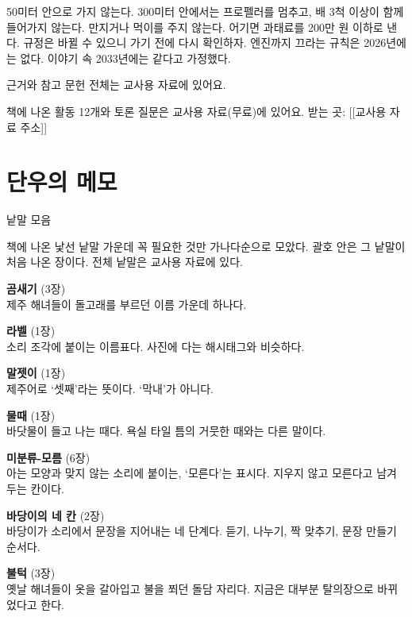 \documentclass[
  korean,
  letterpaper,
  twoside,
  open=any,
  fontsize=12.5pt,
  headings=small]{scrbook}
\newcommand{\backmatterstyle}{\setlength{\parindent}{0pt}\setlength{\parskip}{0.45em plus 0.1em}\backmattersize}
\newcommand{\backmattersize}{\fontsize{10.5pt}{16.5pt}\selectfont}
\begin{document}

50미터 안으로 가지 않는다.
300미터 안에서는 프로펠러를
멈추고, 배 3척 이상이 함께
들어가지 않는다. 만지거나
먹이를 주지 않는다. 어기면
과태료를 200만 원 이하로 낸다.
규정은 바뀔 수 있으니 가기
전에 다시 확인하자. 엔진까지
끄라는 규칙은 2026년에는 없다.
이야기 속 2033년에는 같다고
가정했다.

근거와 참고 문헌 전체는 교사용
자료에 있어요.

책에 나온 활동 12개와 토론
질문은 교사용 자료(무료)에
있어요. 받는 곳: {[}{[}교사용
자료 주소{]}{]}


\chapter*{단우의
메모}\label{uxb2e8uxc6b0uxc758-uxba54uxbaa8}


\backmatterstyle

낱말 모음

책에 나온 낯선 낱말 가운데 꼭
필요한 것만 가나다순으로
모았다. 괄호 안은 그 낱말이
처음 나온 장이다. 전체 낱말은
교사용 자료에 있다.

\textbf{곰새기} (3장)\\
제주 해녀들이 돌고래를 부르던
이름 가운데 하나다.

\textbf{라벨} (1장)\\
소리 조각에 붙이는 이름표다.
사진에 다는 해시태그와
비슷하다.

\textbf{말젯이} (1장)\\
제주어로 `셋째'라는 뜻이다.
`막내'가 아니다.

\textbf{물때} (1장)\\
바닷물이 들고 나는 때다. 욕실
타일 틈의 거뭇한 때와는 다른
말이다.

\textbf{미분류-모름} (6장)\\
아는 모양과 맞지 않는 소리에
붙이는, `모른다'는 표시다.
지우지 않고 모른다고 남겨 두는
칸이다.

\textbf{바당이의 네 칸}
(2장)\\
바당이가 소리에서 문장을
지어내는 네 단계다. 듣기,
나누기, 짝 맞추기, 문장 만들기
순서다.

\textbf{불턱} (3장)\\
옛날 해녀들이 옷을 갈아입고
불을 쬐던 돌담 자리다. 지금은
대부분 탈의장으로 바뀌었다고
한다.
\end{document}
